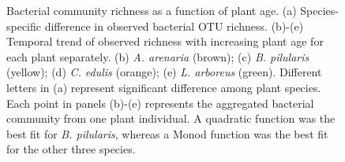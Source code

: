 \newpage
\begin{figure}[h]
	\centering
	\caption[Bacterial community richness as a function of plant age.]
		{\hspace{1mm} 
		Bacterial community richness as a function of plant age. (a) Species-specific difference in observed bacterial OTU richness.
		(b)-(e) Temporal trend of observed richness with increasing plant age for each plant separately. (b) \textit{A. arenaria} (brown); (c) \textit{B. pilularis} (yellow); (d) \textit{C. edulis} (orange); (e) \textit{L. arboreus} (green). 
		Different letters in (a) represent significant difference among plant species. Each point in panels (b)-(e) represents the aggregated bacterial  community from one plant individual. A quadratic function was the best fit for \textit{B. pilularis}, whereas a Monod function was the best fit for the other three species.}
	\label{fig:BacRichness}
\end{figure}



